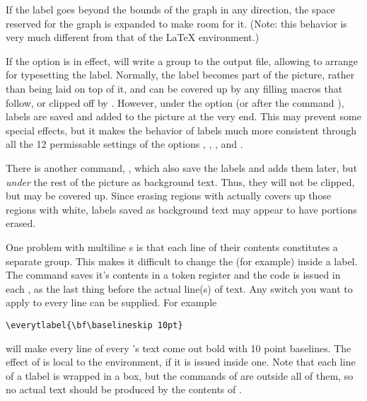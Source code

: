 \documentclass[letterpaper]{article}
\begin{document}
If the label goes beyond the bounds of the graph in any direction, the
space reserved for the graph is expanded to make room for it. (Note:
this behavior is very much different from that of the \LaTeX{}
 environment.)

If the  option is in effect,  will write a
 group to the output file, allowing \MP{} to
arrange for typesetting the label. Normally, the label becomes part of
the picture, rather than being laid on top of it, and can be covered up
by any filling macros that follow, or clipped off by .
However, under the  option (or after the command
), labels are saved and added to the picture at the
very end. This may prevent some special effects, but it makes the
behavior of labels much more consistent through all the 12 permissable
settings of the options , , , and
.

There is another command, , which also save the labels
and adds them later, but \emph{under} the rest of the picture as
background text. Thus, they will not be clipped, but may be covered up.
Since erasing regions with  actually covers up those regions
with white, labels saved as background text may appear to have portions
erased.

\begin{cd}
%
\end{cd}

One problem with multiline s is that each line of their
contents constitutes a separate group. This makes it difficult to change
the  (for example) inside a label. The command
 saves it's contents in a token register and the code is
issued in each , as the last thing before the actual line(s)
of text. Any switch you want to apply to every line can be supplied. For
example
\begin{verbatim}
\everytlabel{\bf\baselineskip 10pt}
\end{verbatim}
will make every line of every 's text come out bold with 10
point baselines. The effect of  is local to the
 environment, if it is issued inside one. Note that each line
of a tlabel is wrapped in a box, but the commands of 
are outside all of them, so no actual text should be produced by the
contents of .
\end{document}
